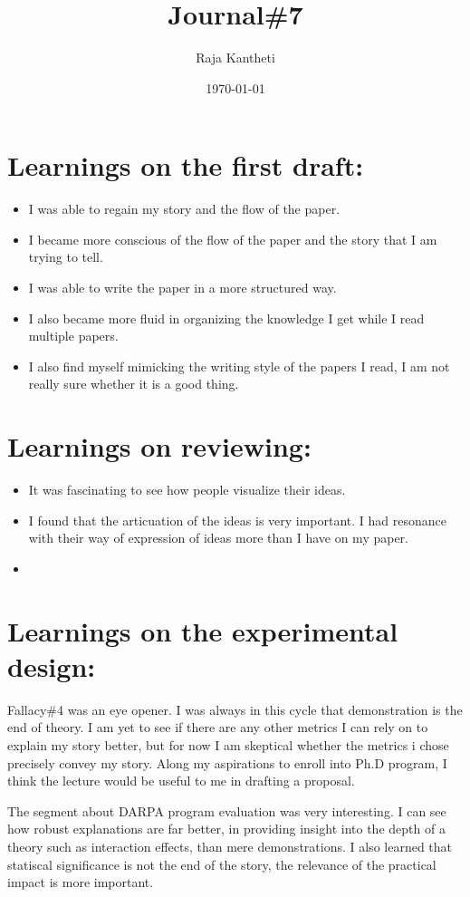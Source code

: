 \documentclass[14pt]{extarticle}
\title{Journal\#7}
\author{Raja Kantheti}
\date{\today}
\begin{document}
\maketitle
\section*{Learnings on the first draft: }
\begin{itemize}
    \item I was able to regain my story and the flow of the paper.
    \item I became more conscious of the flow of the paper and the story that I am trying to tell.
    \item I was able to write the paper in a more structured way.
    \item I also became more fluid in organizing the knowledge I get while I read multiple papers.
    \item I also find myself mimicking the writing style of the papers I read, I am not really sure whether it is a good thing.
\end{itemize}
\section*{Learnings on reviewing: }
\begin{itemize}
    \item It was fascinating to see how people visualize their ideas.
    \item I found that the articuation of the ideas is very important. I had resonance with their way of expression of ideas more than I have on my paper. 
    \item 
\end{itemize}

\section*{Learnings on the experimental design: }
Fallacy\#4 was an eye opener. I was always in this cycle that demonstration is the end of theory.
I am yet to see if there are any other metrics I can rely on to explain my story better, but for now I am skeptical whether the metrics i chose precisely convey my story.
Along my aspirations to enroll into Ph.D program, I think the lecture would be useful to me in drafting a proposal.

The segment about DARPA program evaluation was very interesting. I can see how robust explanations are far better, in providing insight into the depth of a theory such as interaction effects, than mere demonstrations.
I also learned that statiscal significance is not the end of the story, the relevance of the practical impact is more important.
\end{document}
